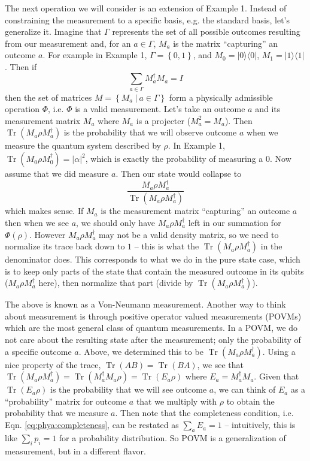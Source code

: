 \documentclass[11pt]{article}
\newcommand{\abs}[1]{\left\lvert #1 \right\rvert}
\newcommand{\set}[1]{\left\{ #1 \right\}}
\newcommand{\tr}{\operatorname{Tr}}
\newcommand{\bra}[1]{\langle #1 \rvert}
\newcommand{\ket}[1]{\lvert #1 \rangle}
\newcommand{\kret}[2]{\ket{#1}\bra{#2}}
\newcommand{\kera}[1]{\kret{#1}{#1}}
\def\fill{   \hfill}
\begin{document}
\noindent The next operation we will consider is an extension of Example 1. Instead of constraining the measurement to a specific basis, e.g. the standard basis, let's generalize it. Imagine that $\Gamma$ represents the set of all possible outcomes resulting from our measurement and, for an $a \in \Gamma$, $M_a$ is the matrix ``capturing'' an outcome $a$. For example in Example 1, $\Gamma = \set{0, 1}$, and $M_0 = \kera{0}$, $M_1 = \kera{1}$. Then if
\begin{equation*}
\sum_{a \in \Gamma} M^\dag_aM_a = I
\end{equation*}
then the set of matrices $M = \set{M_a \: | \: a \in \Gamma}$ form a physically admissible operation $\Phi$, i.e. $\Phi$ is a valid measurement. Let's take an outcome $a$ and its measurement matrix $M_a$ where $M_a$ is a projecter ($M^2_a = M_a$). Then $\tr(M_a\rho M^\dag_a)$ is the probability that we will observe outcome $a$ when we measure the quantum system described by $\rho$. In Example 1, $\tr(M_0\rho M^\dag_0) = \abs{\alpha}^2$, which is exactly the probability of measuring a $0$. Now assume that we did measure $a$. Then our state would collapse to
\begin{equation*}
\frac{M_a\rho M^\dag_a}{\tr(M_a\rho M^\dag_a)}
\end{equation*}
which makes sense. If $M_a$ is the measurement matrix ``capturing'' an outcome $a$ then when we see $a$, we should only have $M_a\rho M^\dag_a$ left in our summation for $\Phi(\rho)$. However $M_a\rho M^\dag_a$ may not be a valid density matrix, so we need to normalize its trace back down to $1$ -- this is what the $\tr(M_a\rho M^\dag_a)$ in the denominator does. This corresponds to what we do in the pure state case, which is to keep only parts of the state that contain the measured outcome in its qubits ($M_a\rho M^\dag_a$ here), then normalize that part (divide by $\tr(M_a\rho M^\dag_a)$).

\fill

\noindent The above is known as a Von-Neumann measurement. Another way to think about measurement is through positive operator valued measurements (POVMs) which are the most general class of quantum measurements. In a POVM, we do not care about the resulting state after the measurement; only the probability of a specific outcome $a$. Above, we determined this to be $\tr(M_a\rho M^\dag_a)$. Using a nice property of the trace, $\tr(AB) = \tr(BA)$, we see that $\tr(M_a\rho M^\dag_a) = \tr(M^\dag_aM_a \rho ) = \tr(E_a \rho)$ where $E_a = M^\dag_aM_a$. Given that $\tr(E_a \rho)$ is the probability that we will see outcome $a$, we can think of $E_a$ as a ``probability'' matrix for outcome $a$ that we multiply with $\rho$ to obtain the probability that we measure $a$. Then note that the completeness condition, i.e. Eqn. \ref{eq:phya:completeness}, can be restated as $\sum_{a} E_a = 1$ -- intuitively, this is like $\sum_{i} p_i = 1$ for a probability distribution. So POVM is a generalization of measurement, but in a different flavor.
\end{document}
